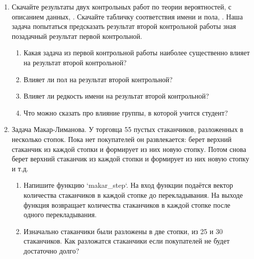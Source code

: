 \documentclass[pdftex,12pt,a4paper]{article}
\begin{document}
\begin{enumerate}


\item Скачайте результаты двух контрольных работ по теории вероятностей, \url{} с описанием данных, \url{}. Скачайте табличку соответствия имени и пола, \url{}. Наша задача попытаться предсказать результат второй контрольной работы зная позадачный результат первой контрольной. 
\begin{enumerate}
\item Какая задача из первой контрольной работы наиболее существенно влияет на результат второй контрольной?
\item Влияет ли пол на результат второй контрольной?
\item Влияет ли редкость имени на результат второй контрольной?
\item Что можно сказать про влияние группы, в которой учится студент?
\end{enumerate}

\item Задача Макар-Лиманова. У торговца 55 пустых стаканчиков, разложенных в несколько стопок. Пока нет покупателей он развлекается: берет верхний стаканчик из каждой стопки и формирует из них новую стопку. Потом снова берет верхний стаканчик из каждой стопки и формирует из них новую стопку и т.д.
\begin{enumerate}
\item Напишите функцию `makar\_step`. На вход функции подаётся вектор количества стаканчиков в каждой стопке до перекладывания. На выходе функция возвращает количества стаканчиков в каждой стопке после одного перекладывания.
\item Изначально стаканчики были разложены в две стопки, из 25 и 30 стаканчиков. Как разложатся стаканчики если покупателей не будет достаточно долго?
\end{enumerate}

\end{enumerate}
\end{document}
